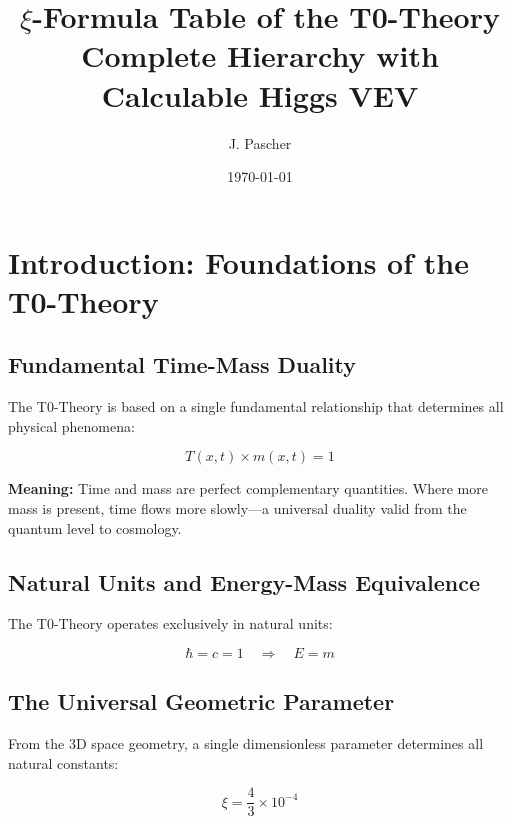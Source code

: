 \documentclass[12pt,a4paper]{article}
\begin{document}
	
	\title{\textbf{\(\xi\)-Formula Table of the T0-Theory}\\
		\large Complete Hierarchy with Calculable Higgs VEV}
	
	\author{J. Pascher}
	\date{\today}
	
	\maketitle
	
	\section{Introduction: Foundations of the T0-Theory}
	
	\subsection{Fundamental Time-Mass Duality}
	
	The T0-Theory is based on a single fundamental relationship that determines all physical phenomena:
	
	\begin{equation}
		\boxed{T(x,t) \times m(x,t) = 1}
	\end{equation}
	
	\textbf{Meaning:} Time and mass are perfect complementary quantities. Where more mass is present, time flows more slowly—a universal duality valid from the quantum level to cosmology.
	
	\subsection{Natural Units and Energy-Mass Equivalence}
	
	The T0-Theory operates exclusively in natural units:
	
	\begin{equation}
		\boxed{\hbar = c = 1 \quad \Rightarrow \quad E = m}
	\end{equation}
	
	\subsection{The Universal Geometric Parameter}
	
	From the 3D space geometry, a single dimensionless parameter determines all natural constants:
	
	\begin{equation}
		\boxed{\xi = \frac{4}{3} \times 10^{-4}}
	\end{equation}
	
\end{document}
